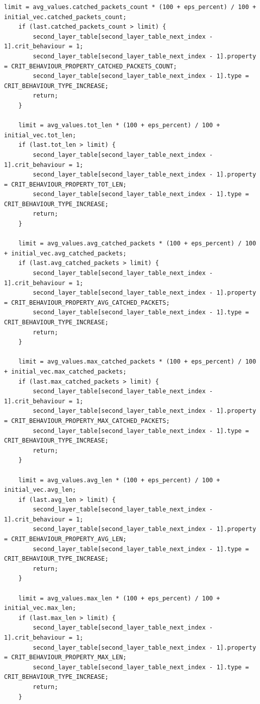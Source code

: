 \documentclass{bmstu}
\begin{document}
\begin{lstlisting}[caption = {Функции обнаружения нестандартного активности во входящем сетевом трафике}, label=lst:anomaly]
    limit = avg_values.catched_packets_count * (100 + eps_percent) / 100 + initial_vec.catched_packets_count;
    if (last.catched_packets_count > limit) {
        second_layer_table[second_layer_table_next_index - 1].crit_behaviour = 1;
        second_layer_table[second_layer_table_next_index - 1].property = CRIT_BEHAVIOUR_PROPERTY_CATCHED_PACKETS_COUNT;
        second_layer_table[second_layer_table_next_index - 1].type = CRIT_BEHAVIOUR_TYPE_INCREASE;
        return;
    }

    limit = avg_values.tot_len * (100 + eps_percent) / 100 + initial_vec.tot_len;
    if (last.tot_len > limit) {
        second_layer_table[second_layer_table_next_index - 1].crit_behaviour = 1;
        second_layer_table[second_layer_table_next_index - 1].property = CRIT_BEHAVIOUR_PROPERTY_TOT_LEN;
        second_layer_table[second_layer_table_next_index - 1].type = CRIT_BEHAVIOUR_TYPE_INCREASE;
        return;
    }

    limit = avg_values.avg_catched_packets * (100 + eps_percent) / 100 + initial_vec.avg_catched_packets;
    if (last.avg_catched_packets > limit) {
        second_layer_table[second_layer_table_next_index - 1].crit_behaviour = 1;
        second_layer_table[second_layer_table_next_index - 1].property = CRIT_BEHAVIOUR_PROPERTY_AVG_CATCHED_PACKETS;
        second_layer_table[second_layer_table_next_index - 1].type = CRIT_BEHAVIOUR_TYPE_INCREASE;
        return;
    }

    limit = avg_values.max_catched_packets * (100 + eps_percent) / 100 + initial_vec.max_catched_packets;
    if (last.max_catched_packets > limit) {
        second_layer_table[second_layer_table_next_index - 1].crit_behaviour = 1;
        second_layer_table[second_layer_table_next_index - 1].property = CRIT_BEHAVIOUR_PROPERTY_MAX_CATCHED_PACKETS;
        second_layer_table[second_layer_table_next_index - 1].type = CRIT_BEHAVIOUR_TYPE_INCREASE;
        return;
    }

    limit = avg_values.avg_len * (100 + eps_percent) / 100 + initial_vec.avg_len;
    if (last.avg_len > limit) {
        second_layer_table[second_layer_table_next_index - 1].crit_behaviour = 1;
        second_layer_table[second_layer_table_next_index - 1].property = CRIT_BEHAVIOUR_PROPERTY_AVG_LEN;
        second_layer_table[second_layer_table_next_index - 1].type = CRIT_BEHAVIOUR_TYPE_INCREASE;
        return;
    }

    limit = avg_values.max_len * (100 + eps_percent) / 100 + initial_vec.max_len;
    if (last.max_len > limit) {
        second_layer_table[second_layer_table_next_index - 1].crit_behaviour = 1;
        second_layer_table[second_layer_table_next_index - 1].property = CRIT_BEHAVIOUR_PROPERTY_MAX_LEN;
        second_layer_table[second_layer_table_next_index - 1].type = CRIT_BEHAVIOUR_TYPE_INCREASE;
        return;
    }


\end{lstlisting}
\end{document}
